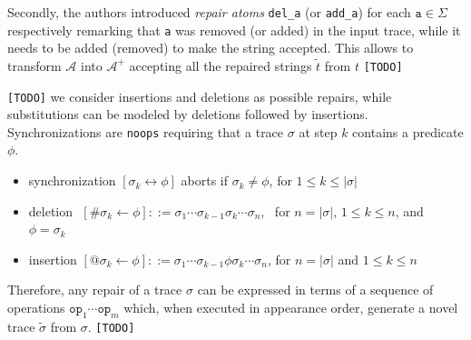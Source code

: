 %
%

Secondly, the authors introduced \textit{repair atoms}  \texttt{del\_a} (or \texttt{add\_a}) for each $\texttt{a}\in\Sigma$ respectively remarking that \texttt{a} was removed (or added) in the input trace, while it needs to be added (removed) to make the string accepted. This allows to transform $\mathcal{A}$ into $\mathcal{A}^+$ accepting all the repaired strings $\tilde{t}$ from $t$ \texttt{\color{red}[TODO]}


\texttt{\color{red}[TODO]} we consider insertions and deletions as possible repairs, while substitutions can be modeled by deletions followed by insertions. Synchronizations are \texttt{noops} requiring that a trace $\sigma$ at step $k$ contains a predicate $\phi$. 
\begin{itemize}
	\item synchronization $[\sigma_k\leftrightarrow \phi]$ aborts if $\sigma_k\neq\phi$, for  $1\leq k\leq |\sigma|$
	\item deletion\,\, $[\#\sigma_k\leftarrow \phi]::= \sigma_1\cdots\sigma_{k-1}\sigma_{k}\cdots \sigma_n$,\,\,\, for $n=|\sigma|$, $1\leq k\leq n$, and $\phi=\sigma_k$
	\item insertion $[@\sigma_k\leftarrow \phi]::= \sigma_1\cdots\sigma_{k-1}\phi\sigma_{k}\cdots \sigma_n$, for $n=|\sigma|$ and $1\leq k\leq n$
\end{itemize}
Therefore, any repair  of a trace $\sigma$ can be expressed in terms of a sequence of operations $\texttt{op}_1\cdots \texttt{op}_m$ which, when executed in appearance order, generate a novel trace $\tilde{\sigma}$ from $\sigma$.  \texttt{\color{red}[TODO]}


